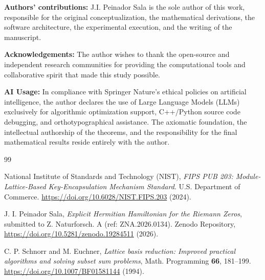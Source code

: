 \documentclass[sn-mathphys, a4paper]{sn-jnl}
\begin{document}
\textbf{Authors' contributions:} J.I. Peinador Sala is the sole author of this work, responsible for the original conceptualization, the mathematical derivations, the software architecture, the experimental execution, and the writing of the manuscript.

\textbf{Acknowledgements:} The author wishes to thank the open-source and independent research communities for providing the computational tools and collaborative spirit that made this study possible.

\textbf{AI Usage:} In compliance with Springer Nature's ethical policies on artificial intelligence, the author declares the use of Large Language Models (LLMs) exclusively for algorithmic optimization support, C++/Python source code debugging, and orthotypographical assistance. The axiomatic foundation, the intellectual authorship of the theorems, and the responsibility for the final mathematical results reside entirely with the author.

\begin{thebibliography}{99}

National Institute of Standards and Technology (NIST), \textit{FIPS PUB 203: Module-Lattice-Based Key-Encapsulation Mechanism Standard}. U.S. Department of Commerce. \url{https://doi.org/10.6028/NIST.FIPS.203} (2024).

J. I. Peinador Sala, \textit{Explicit Hermitian Hamiltonian for the Riemann Zeros}, submitted to Z. Naturforsch. A (ref: ZNA.2026.0134). Zenodo Repository, \url{https://doi.org/10.5281/zenodo.19284511} (2026).

C. P. Schnorr and M. Euchner, \textit{Lattice basis reduction: Improved practical algorithms and solving subset sum problems}, Math. Programming \textbf{66}, 181--199. \url{https://doi.org/10.1007/BF01581144} (1994).

\end{thebibliography}
\end{document}
